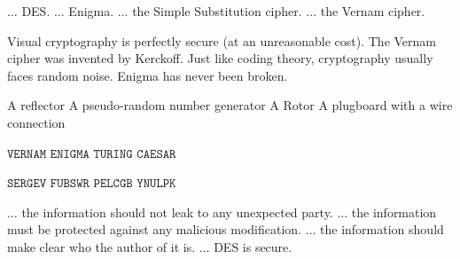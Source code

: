 %
{$ \dots $ DES.}%
{$ \dots $ Enigma.}%
{$ \dots $ the Simple Substitution cipher.}%
{$ \dots $ the Vernam cipher.}%

%
{Visual cryptography is perfectly secure (at an unreasonable cost).}%
{The Vernam cipher was invented by Kerckoff.}%
{Just like coding theory, cryptography usually faces random noise.}%
{Enigma has never been broken.}%

%
{A reflector}%
{A pseudo-random number generator}%
{A Rotor}%
{A plugboard with a wire connection}%

%
{$ \texttt{VERNAM} $}%
{$ \texttt{ENIGMA} $}%
{$ \texttt{TURING} $}%
{$ \texttt{CAESAR} $}%

%
{$ \texttt{SERGEV} $}%
{$ \texttt{FUBSWR} $}%
{$ \texttt{PELCGB} $}%
{$ \texttt{YNULPK} $}%

%
{$ \dots $ the information should not leak to any unexpected party.}%
{$ \dots $ the information must be protected against any malicious modification.}%
{$ \dots $ the information should make clear who the author of it is.}%
{$ \dots $ DES is secure.}%
